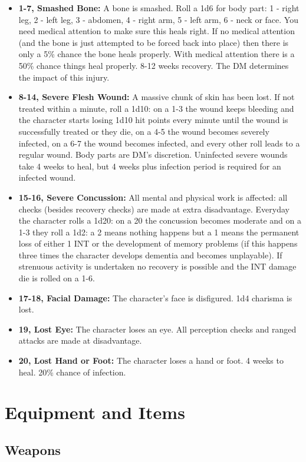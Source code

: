 \documentclass[letterpaper,12pt]{article}
\begin{document}
\begin{itemize}
\item \textbf{1-7, Smashed Bone:} A bone is smashed. Roll a 1d6 for body part: 1 - right leg, 2 - left leg, 3 - abdomen, 4 - right arm, 5 - left arm, 6 - neck or face. You need medical attention to make sure this heals right. If no medical attention (and the bone is just attempted to be forced back into place) then there is only a 5\% chance the bone heals properly. With medical attention there is a 50\% chance things heal properly. 8-12 weeks recovery. The DM determines the impact of this injury.
\item \textbf{8-14, Severe Flesh Wound:} A massive chunk of skin has been lost. If not treated within a minute, roll a 1d10: on a 1-3 the wound keeps bleeding and the character starts losing 1d10 hit points every minute until the wound is successfully treated or they die, on a 4-5 the wound becomes severely infected, on a 6-7 the wound becomes infected, and every other roll leads to a regular wound. Body parts are DM's discretion. Uninfected severe wounds take 4 weeks to heal, but 4 weeks plus infection period is required for an infected wound. 
\item \textbf{15-16, Severe Concussion:} All mental and physical work is affected: all checks (besides recovery checks) are made at extra disadvantage. Everyday the character rolls a 1d20: on a 20 the concussion becomes moderate and on a 1-3 they roll a 1d2: a 2 means nothing happens but a 1 means the permanent loss of either 1 INT or the development of memory problems (if this happens three times the character develops dementia and becomes unplayable). If strenuous activity is undertaken no recovery is possible and the INT damage die is rolled on a 1-6. 
\item \textbf{17-18, Facial Damage:} The character's face is disfigured. 1d4 charisma is lost.
\item \textbf{19, Lost Eye:} The character loses an eye. All perception checks and ranged attacks are made at disadvantage.
\item \textbf{20, Lost Hand or Foot:} The character loses a hand or foot. 4 weeks to heal. 20\% chance of infection.  
\end{itemize} 

\section{Equipment and Items}\label{Equipment}

\subsection{Weapons}
\end{document}
